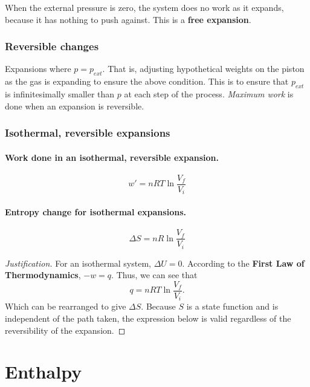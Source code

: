 \documentclass{article}
\numberwithin{theorem}{section}
\numberwithin{corollary}{section}
\numberwithin{postulate}{section}
\numberwithin{lemma}{section}
\numberwithin{definition}{section}
\newenvironment{justification} {\begin{proof}[Justification]} {\end{proof}}
\begin{document}
When the external pressure is zero, the system does no work as it expands,
because it has nothing to push against. This is a \textbf{free expansion}.

\subsubsection{Reversible changes}


Expansions where $p = p_{ext}$. That is, adjusting hypothetical weights on the
piston as the gas is expanding to ensure the above condition. This is to ensure
that $p_{ext}$ is infinitesimally smaller than $p$ at each step of the process.
\textit{Maximum work} is done when an expansion is reversible.

\subsubsection{Isothermal, reversible expansions}

\paragraph{Work done in an isothermal, reversible expansion. }

\begin{equation}
  w' = nRT\ln{\frac{V_f}{V_i}}
\end{equation}

\paragraph{Entropy change for isothermal expansions. }

\begin{equation}
  \Delta S = nR \ln{\frac{V_f}{V_i}}
\end{equation}

\begin{justification}
  For an isothermal system, $\Delta U = 0$. According to the \textbf{First Law
  of Thermodynamics}, $-w = q$. Thus, we can see that
  \begin{equation*}
      q = nRT\ln{\frac{V_f}{V_i}}.
  \end{equation*} Which can be rearranged to give $\Delta S$. Because $S$ is a
  state function and is independent of the path taken, the expression below is
  valid regardless of the reversibility of the expansion.
\end{justification}

\section{Enthalpy}
\end{document}
